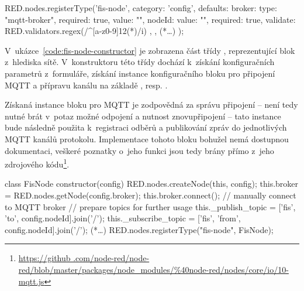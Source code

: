 \begin{code}[
    language=Javascript,
    label=code:fis-node-editor,
    caption={Registrace vlastního bloku do editoru sítě v~nástroji Node-RED -- kromě identifikačního klíče do
    registru bloků \ic{\'fis-node\'} se zde nachází definice parametrů a zařazení do konfiguračních bloků
    pomocí zvolené kategorie \ic{\'config\'}.}
]
RED.nodes.registerType('fis-node', {
    category: 'config',
    defaults: {
        broker: {type: "mqtt-broker", required: true, value: ""},
        nodeId: {
            value: "", required: true,
            validate: RED.validators.regex(/^[a-z0-9]{12}(*\textdollar*)/i)
        },
    },
    (*\ldots*)
});
\end{code}

V~ukázce~\ref{code:fis-node-constructor} je zobrazena část třídy , reprezentující blok z~hlediska sítě.
V~konstruktoru této třídy dochází k~získání konfiguračních
parametrů z~formuláře, získání instance konfiguračního bloku pro připojení MQTT a přípravu kanálu na základě
, resp. .

Získaná instance bloku pro MQTT je zodpovědná za správu připojení -- není tedy nutné brát v~potaz možné odpojení a
nutnost znovupřipojení -- tato instance bude následně použita k~registraci odběrů a publikování zpráv do jednotlivých
MQTT kanálů protokolu.
Implementace tohoto bloku bohužel nemá dostupnou dokumentaci, veškeré poznatky o~jeho funkci jsou tedy brány přímo
z~jeho zdrojového kódu\footnote{\url{https://github
.com/node-red/node-red/blob/master/packages/node_modules/\%40node-red/nodes/core/io/10-mqtt.js}}.

\begin{code}[
    language=Javascript,
    label=code:fis-node-constructor,
    caption={Část konstruktoru třídy \ic{FisNode} obsluhující připojení brokeru MQTT a přípravu kanálů pro komunikaci.
    Důležitá je příprava části kanálů, které jsou následně použity pro publikování a odběr zpráv -- v atributu
    \ic{_publish_topic} je uložen kanál s identifikací uzlu, identifikace aplikace, dle kapitoly~\ref{sec:mqtt-kanaly}, připojí
    třída až při publikování pro konkrétní aplikaci. Druhým předpřipraveným kanálem je kanál pro odběr zprávy z uzlu
    -- ten je uložen v atributu \ic{_subscribe_topic}.}
]
class FisNode {
    constructor(config) {
        RED.nodes.createNode(this, config);
        this.broker = RED.nodes.getNode(config.broker);
        this.broker.connect(); // manually connect to MQTT broker
        // prepare topics for further usage
        this._publish_topic = ['fis', 'to', config.nodeId].join('/');
        this._subscribe_topic = ['fis', 'from', config.nodeId].join('/');
    }
    (*\ldots*)
    RED.nodes.registerType("fis-node", FisNode);
}
\end{code}

